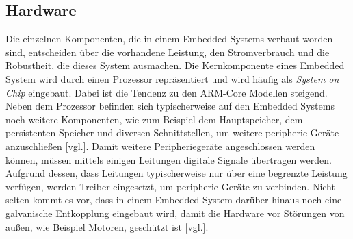 \subsection{Hardware}
\label{subsec:EmbeddedHardware}
Die einzelnen Komponenten, die in einem Embedded Systems verbaut worden sind, entscheiden über
die vorhandene Leistung, den Stromverbrauch und die Robustheit, die dieses System ausmachen. Die
Kernkomponente eines Embedded System wird durch einen Prozessor repräsentiert und
wird häufig als \emph{System on Chip} eingebaut. Dabei ist die Tendenz zu den ARM-Core Modellen
steigend. Neben dem Prozessor befinden sich typischerweise auf den Embedded Systems noch
weitere Komponenten, wie zum Beispiel dem Hauptspeicher, dem persistenten Speicher und diversen
Schnittstellen, um weitere peripherie Geräte anzuschließen \cite{EmbeddeHardware}[vgl.].
\newline
\newline
Damit weitere Peripheriegeräte angeschlossen werden können, müssen mittels einigen Leitungen
digitale Signale übertragen werden. Aufgrund dessen, dass Leitungen typischerweise nur über eine
begrenzte Leistung verfügen, werden Treiber eingesetzt, um peripherie Geräte zu verbinden.
Nicht selten kommt es vor, dass in einem Embedded System darüber hinaus noch eine galvanische
Entkopplung eingebaut wird, damit die Hardware
vor Störungen von außen, wie Beispiel Motoren, geschützt ist \cite{EmbeddedLinuxQuade}[vgl.].